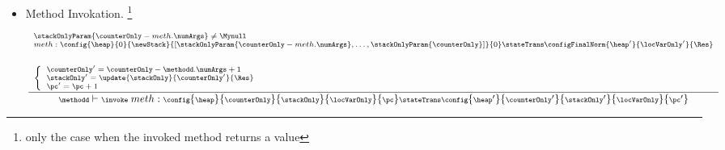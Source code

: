 \begin{itemize}
           The stack top element  must be a reference of an object of type \\ \Throwable. 
	  If there is a handler that protects this bytecode instruction from the exception thrown, the control is transfered
	  to the instruction at which the exception handler starts\footnote{for every method the ExceptionHandler
	  table describes the corresponding exception handler by the limits of the 
	  region it protects, the Exception that it catches, and the instruction at which it starts}.
	  If the object on the stack top is \Mynull, a \NullPointerExc \ is thrown. 

 \item Method Invokation. \invoke \footnote{ only the case when  the invoked method returns a value}
      
         $$ {\scriptsize \frac{\begin{array}{l} \stackOnlyParam{ \counterOnly - meth.\numArgs } \neq \Mynull   \\
	                         meth : %
			                        \config{\heap}       
                                                       {0}
						       {\newStack }
                                                       {\lbrack \stackOnlyParam{ \counterOnly - meth.\numArgs },\ldots ,\stackOnlyParam{ \counterOnly} \rbrack }
						       {0} 
						         \stateTrans 
						\configFinalNorm{\heap'}{\locVarOnly'}{\Res}\\
                                                   \\
			  			 \\
			\left\{\begin{array}{l}
			       \counterOnly' = \counterOnly - \methodd.\numArgs + 1 \\
			       \stackOnly' = \update{\stackOnly}{\counterOnly'}{\Res} \\
			       \pc' = \pc + 1
			\end{array}\right. 
	         \end{array} 	      
	         }	         
	         {\methodd \vdash \invoke \  meth :  \config{\heap}{\counterOnly}{\stackOnly}{\locVarOnly}{\pc} 
		                        \stateTrans  
					\config{\heap' }{\counterOnly'}{\stackOnly' }{\locVarOnly}{\pc'}} } $$
	  

\end{itemize}
